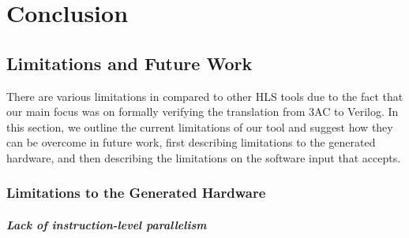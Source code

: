 \chapter{Conclusion}%
\label{sec:conclusion}

\section{Limitations and Future Work}

There are various limitations in \vericert{} compared to other HLS tools due to the fact that our main focus was on formally verifying the translation from 3AC to Verilog. In this section, we outline the current limitations of our tool and suggest how they can be overcome in future work, first describing limitations to the generated hardware, and then describing the limitations on the software input that \vericert{} accepts.


\subsection{Limitations to the Generated Hardware}


\paragraph{Lack of instruction-level parallelism}

